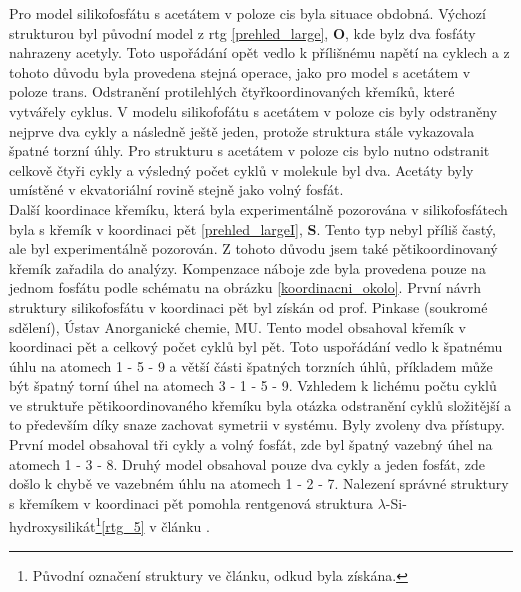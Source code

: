 \documentclass[
digital, %
table,   %
lof,     %
lot,     %
oneside,
]{fithesis3}
\begin{document}
Pro model silikofosfátu s acetátem v poloze cis byla situace obdobná. Výchozí strukturou byl původní model z rtg \ref{prehled_large}, \textbf{O}, kde bylz dva fosfáty nahrazeny acetyly. Toto uspořádání opět vedlo k přílišnému napětí na cyklech a z tohoto důvodu byla provedena stejná operace, jako pro model s acetátem v poloze trans. Odstranění protilehlých čtyřkoordinovaných křemíků, které vytvářely cyklus. V modelu silikofofátu s acetátem v poloze cis byly odstraněny nejprve dva cykly a následně ještě jeden, protože struktura stále vykazovala špatné torzní úhly.
Pro strukturu s acetátem v poloze cis bylo nutno odstranit celkově čtyři cykly a výsledný počet cyklů v molekule byl dva. Acetáty byly umístěné v ekvatoriální rovině stejně jako volný fosfát. \\
Další koordinace křemíku, která byla experimentálně pozorována v silikofosfátech byla s křemík v koordinaci pět \ref{prehled_largeI}, \textbf{S}. Tento typ nebyl příliš častý, ale byl experimentálně pozorován.  Z tohoto důvodu jsem také pětikoordinovaný křemík zařadila do analýzy. Kompenzace náboje zde byla provedena pouze na jednom fosfátu podle schématu na obrázku \ref{koordinacni_okolo}. První návrh struktury silikofosfátu v koordinaci pět byl získán od prof. Pinkase (soukromé sdělení), Ústav Anorganické chemie, MU. Tento model obsahoval křemík v koordinaci pět a celkový počet cyklů byl pět. Toto uspořádání vedlo k špatnému úhlu na atomech 1 - 5 - 9 a větší části špatných torzních úhlů, příkladem může být špatný torní úhel na atomech 3 - 1 - 5 - 9.  Vzhledem k lichému počtu cyklů ve struktuře pětikoordinovaného křemíku byla otázka odstranění cyklů složitější a to především díky snaze zachovat symetrii v systému. Byly zvoleny dva přístupy. První model obsahoval tři cykly a volný fosfát, zde byl špatný vazebný úhel na atomech 1 - 3 - 8. Druhý model obsahoval pouze dva cykly a jeden fosfát, zde došlo k chybě ve vazebném úhlu na atomech 1 - 2 - 7. Nalezení správné struktury s křemíkem v koordinaci pět pomohla rentgenová struktura $\lambda$-Si-hydroxysilikát\footnote{Původní označení struktury ve článku, odkud byla získána.}\ref{rtg_5} v článku \cite{rtg_5}.
\end{document}
